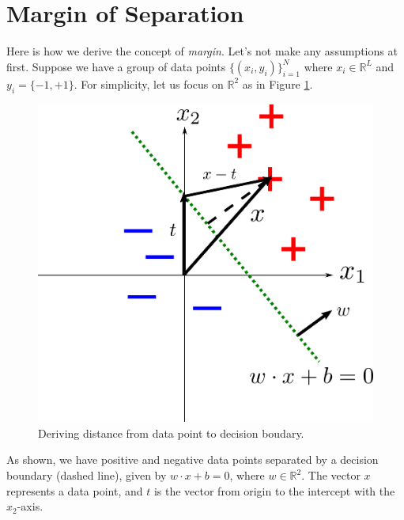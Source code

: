 \documentclass[12pt]{article}
\title{}
\theoremstyle{definition}
\begin{document}
\pagestyle{fancy}
\fancyhf{} %
\cfoot{\thepage}
\renewcommand{\headrulewidth}{1pt}

\section{Margin of Separation}
Here is how we derive the concept of \emph{margin}. Let's not make any assumptions at first. Suppose we have a group of data points $\{(x_i,y_i)\}_{i=1}^N$ where $x_i\in\mathbb{R}^L$ and $y_i=\{-1,+1\}$. For simplicity, let us focus on $\mathbb{R}^2$ as in Figure \ref{fig:margin_compute}.

\begin{figure}[h]
  \centering
  \includegraphics[scale=0.8]{figs/margin_compute}
  \caption{Deriving distance from data point to decision boudary.}
  \label{fig:margin_compute}
\end{figure}

As shown, we have positive and negative data points separated by a decision boundary (dashed line), given by $w\cdot x+b=0$, where $w\in\mathbb{R}^2$. The vector $x$ represents a data point, and $t$ is the vector from origin to the intercept with the $x_2$-axis.
\end{document}

